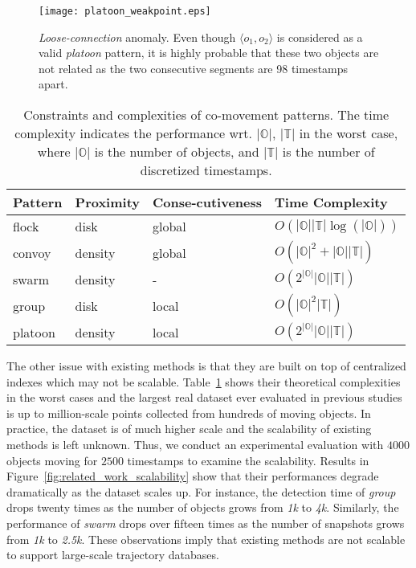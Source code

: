 \begin{figure}[h]
\center
\texttt{[image: platoon\_weakpoint.eps]}
\caption{\emph{Loose-connection} anomaly. Even though $\langle o_1, o_2\rangle$ is considered as a valid \emph{platoon} pattern, it is highly probable that these two objects are not related as the two consecutive segments  are 98 timestamps apart. 
}
\label{fig:platoon_weakpoint}
\end{figure}

\begin{table}[t]
\centering
\begin{tabular}{|l|l|l|l|}
\hline 
\textbf{Pattern} & {\textbf{Proximity}} & { \textbf{Conse-cutiveness}} & { \textbf{Time Complexity}}\\ 
\hline 
flock~\cite{gudmundsson2006computing} & disk &  global & {$O(|\mathbb{O}||\mathbb{T}|\log(|\mathbb{O}|))$} \\ 
\hline 
convoy~\cite{jeung2008discovery} & density &   global & {$O(|\mathbb{O}|^2+|\mathbb{O}||\mathbb{T}|)$}\\ 
\hline 
swarm~\cite{li2010swarm} & density  & - & {$O(2^{|\mathbb{O}|}|\mathbb{O}||\mathbb{T}|)$}  \\ 
\hline 
group~\cite{wang2006grouppattern} & disk &  local & {$O(|\mathbb{O}|^2|\mathbb{T}|)$}\\ 
\hline 
platoon~\cite{li2015platoon} & density &  local & {$O(2^{|\mathbb{O}|}|\mathbb{O}||\mathbb{T}|)$}\\ 
\hline 
\end{tabular} 
\caption{Constraints and complexities of co-movement patterns. The time complexity indicates the performance wrt.
$|\mathbb{O}|$, $|\mathbb{T}|$ in the worst case, where $|\mathbb{O}|$ is the number of objects, and $|\mathbb{T}|$ is the number of discretized timestamps.}
\label{tbl:existing_co_patterns}
\end{table}

The other issue with existing methods is that they are built on top of centralized indexes which may not be scalable. Table~\ref{tbl:existing_co_patterns} shows their theoretical complexities in the worst cases and the largest real dataset ever evaluated in previous studies is up to million-scale points collected from hundreds of moving objects. In practice, the dataset is of much higher scale and the scalability of existing methods is left unknown. Thus, we conduct an experimental evaluation with $4000$ objects moving for $2500$ timestamps to examine the scalability. Results in Figure~\ref{fig:related_work_scalability} show that their performances degrade dramatically as the dataset scales up. For instance, the detection time of \emph{group} drops twenty times as the number of objects grows from \emph{1k} to \emph{4k}. Similarly,
the performance of \emph{swarm} drops over fifteen times as the number of snapshots grows from \emph{1k} to \emph{2.5k}.
These observations imply that existing methods are not scalable to support large-scale trajectory databases. 

